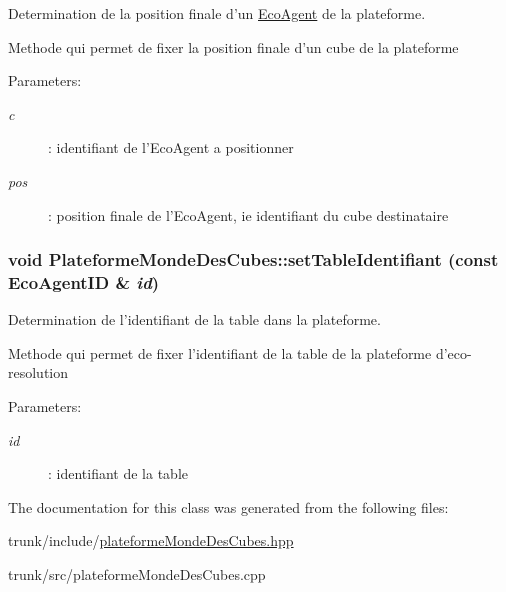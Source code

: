 Determination de la position finale d'un \hyperlink{classEcoAgent}{EcoAgent} de la plateforme. 

Methode qui permet de fixer la position finale d'un cube de la plateforme

\begin{Desc}
\item[Parameters:]
\begin{description}
\item[{\em c}]: identifiant de l'EcoAgent a positionner \item[{\em pos}]: position finale de l'EcoAgent, ie identifiant du cube destinataire \end{description}
\end{Desc}
\hypertarget{classPlateformeMondeDesCubes_cf6eccc70251d89c4d12c921f44934af}{
\subsubsection[{setTableIdentifiant}]{\setlength{\rightskip}{0pt plus 5cm}void PlateformeMondeDesCubes::setTableIdentifiant (const {\bf EcoAgentID} \& {\em id})}}
\label{classPlateformeMondeDesCubes_cf6eccc70251d89c4d12c921f44934af}


Determination de l'identifiant de la table dans la plateforme. 

Methode qui permet de fixer l'identifiant de la table de la plateforme d'eco-resolution

\begin{Desc}
\item[Parameters:]
\begin{description}
\item[{\em id}]: identifiant de la table \end{description}
\end{Desc}


The documentation for this class was generated from the following files:\begin{CompactItemize}
\item 
trunk/include/\hyperlink{plateformeMondeDesCubes_8hpp}{plateformeMondeDesCubes.hpp}\item 
trunk/src/plateformeMondeDesCubes.cpp\end{CompactItemize}
